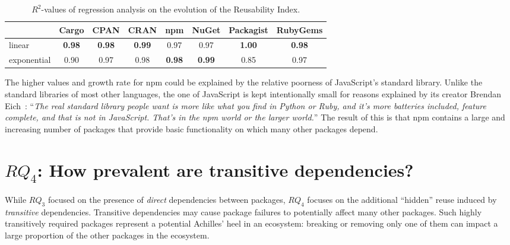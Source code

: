 \documentclass[smallextended]{svjour3}       %
\newcommand{\sect}[1]{Section~\ref{#1}}
\newcommand{\cran}{\textsf{CRAN}\xspace}
\newcommand{\cpan}{\textsf{CPAN}\xspace}
\newcommand{\rubygems}{\textsf{RubyGems}\xspace}
\newcommand{\packagist}{\textsf{Packagist}\xspace}
\newcommand{\cargo}{\textsf{Cargo}\xspace}
\newcommand{\nuget}{\textsf{NuGet}\xspace}
\newcommand{\npm}{\textsf{npm}\xspace}
\newcommand{\javascript}{\textsf{JavaScript}\xspace}
\newcommand{\ruby}{\textsf{Ruby}\xspace}
\newcommand{\python}{\textsf{Python}\xspace}
\begin{document}
\begin{table}[!htbp]
\caption{$R^2$-values of regression analysis on the evolution of the Reusability Index.}
\label{tab:reuse_regressions}\centering
\begin{tabular}{l||c|c|c|c|c|c|c}
 \bf  & \cargo & \cpan & \cran & \npm & \nuget & \packagist & \rubygems\\
  \hline%
 linear & \bf 0.98 & \bf 0.98 & \bf 0.99 & 0.97 & 0.97 & \bf 1.00 & \bf 0.98\\ %
 exponential & 0.90 & 0.97 & 0.98 & \bf 0.98 & \bf 0.99 & 0.85 & 0.97
\end{tabular}
\end{table}

The higher values and growth rate for \npm could be explained by the relative poorness of \javascript's standard library. Unlike the standard libraries of most other languages, the one of \javascript is kept intentionally small for reasons explained by its creator Brendan Eich~\cite{Hemel2010}:
``\textit{The real standard library people want is more like what you find in \python or \ruby, and it's more batteries included, feature complete, and that is not in \javascript. That's in the \npm world or the larger world.}''
The result of this is that \npm contains a large and increasing number of packages that provide basic functionality on which many other packages depend.



\section{$RQ_4$: How prevalent are transitive dependencies?}\label{sec:rq-complexity}

While $RQ_3$ %
focused on the presence of \emph{direct} dependencies between packages, $RQ_4$ focuses on the additional ``hidden'' reuse induced by \emph{transitive} dependencies. 
Transitive dependencies may cause package failures to potentially affect many other packages.
Such highly transitively required packages represent a potential Achilles' heel in an ecosystem: breaking or removing only one of them can impact a large proportion of the other packages in the ecosystem.
\end{document}
